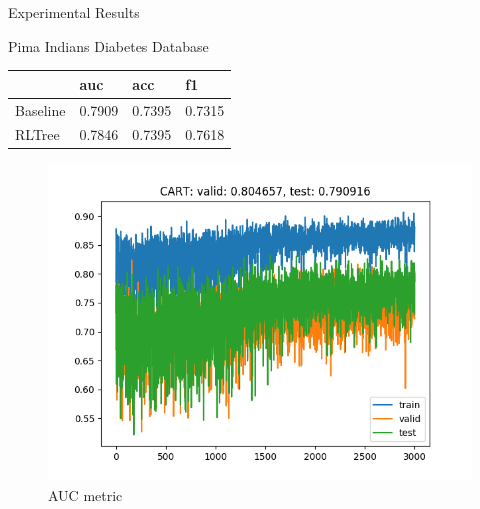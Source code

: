\documentclass{beamer}
\begin{document}
\begin{frame}{Experimental Results}
	\begin{block}{Pima Indians Diabetes Database}
		\begin{table}[]
			\begin{tabular}{llll}
				\hline
				& auc    & acc    & f1     \\ \hline
				Baseline & 0.7909 & 0.7395 & 0.7315 \\
				RLTree   & 0.7846 & 0.7395 & 0.7618 \\ \hline
			\end{tabular}
		\end{table}
	\end{block}
	\begin{figure}{}
		\includegraphics[scale=0.4]{pima_auc_sample_curve}
		\caption{AUC metric}
	\end{figure}
\end{frame}
\end{document}
